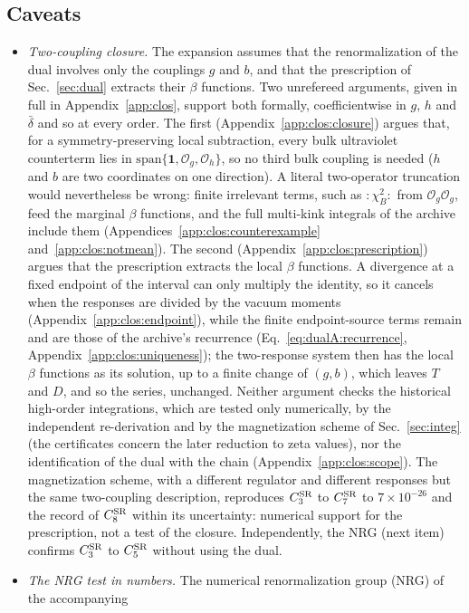 \documentclass[11pt,a4paper]{article}
\numberwithin{equation}{section}
\newcommand{\CSR}{C^{\rm SR}}
\newcommand{\db}{\bar\delta}
\newcommand{\Og}{\mathcal O_g}
\newcommand{\Oh}{\mathcal O_h}
\newcommand{\sci}[2]{#1\times10^{#2}}
\begin{document}
\subsection{Caveats}\label{sec:d1caveats}
\begin{itemize}
\item \emph{Two-coupling closure.} The expansion assumes that the renormalization of the dual involves only the
 couplings $g$ and $b$, and that the prescription of Sec.~\ref{sec:dual} extracts their $\beta$ functions. Two
 unrefereed arguments, given in full in Appendix~\ref{app:clos}, support both formally, coefficientwise in $g$, $h$
 and $\db$ and so at every order. The first (Appendix~\ref{app:clos:closure}) argues that, for a symmetry-preserving
 local subtraction, every bulk ultraviolet counterterm lies in $\mathrm{span}\{\mathbf 1,\Og,\Oh\}$, so no third bulk coupling is needed ($h$ and $b$ are two coordinates on one
 direction). A literal two-operator truncation would nevertheless be wrong: finite irrelevant terms, such as
 ${:}\chi_B^2{:}$ from $\Og\Og$, feed the marginal $\beta$ functions, and the full multi-kink integrals of the archive
 include them (Appendices~\ref{app:clos:counterexample} and~\ref{app:clos:notmean}). The second
 (Appendix~\ref{app:clos:prescription}) argues that the prescription extracts the local $\beta$ functions. A
 divergence at a fixed endpoint of the interval can only multiply the identity, so it cancels when the responses are
 divided by the vacuum moments (Appendix~\ref{app:clos:endpoint}), while the finite endpoint-source terms remain
 and are those of the archive's recurrence (Eq.~\eqref{eq:dualA:recurrence}, Appendix~\ref{app:clos:uniqueness}); the two-response system then has the local $\beta$ functions as its solution, up to a finite change of
 $(g,b)$, which leaves $T$ and $D$, and so the series, unchanged. Neither argument checks the historical high-order
 integrations, which are tested only numerically, by the independent re-derivation and by the magnetization scheme of
 Sec.~\ref{sec:integ} (the certificates concern the later reduction to zeta values), nor the identification of the dual
 with the chain (Appendix~\ref{app:clos:scope}). The magnetization scheme, with a different regulator and different
 responses but the same two-coupling description, reproduces $\CSR_3$ to $\CSR_7$ to $\sci{7}{-26}$ and the record of
 $\CSR_8$ within its uncertainty: numerical support for the prescription, not a test of the closure. Independently, the NRG (next item) confirms $\CSR_3$ to $\CSR_5$ without using the dual.
\item \emph{The NRG test in numbers.} The numerical renormalization group (NRG) of the accompanying

\end{itemize}
\end{document}
